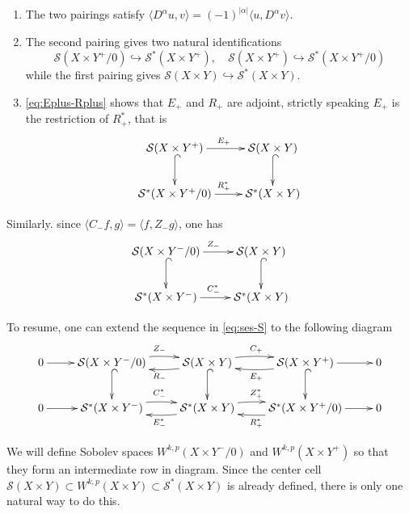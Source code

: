 \begin{remark}
\label{rem:coupling-S}
\begin{enumerate}
\item The two pairings satisfy \(\langle D^\alpha u, v \rangle = (-1)^{|\alpha|} \langle u,
   D^\alpha v \rangle\).
\item The second pairing gives two natural identifications
\[
    \mathcal{S}(X\times Y^+/0) \hookrightarrow \mathcal{S}^*(X\times Y^+),\quad
   \mathcal{S}(X\times Y^+) \hookrightarrow \mathcal{S}^*(X\times Y^+/0)
   \]
while the first pairing gives \(\mathcal{S}(X\times Y) \hookrightarrow
   \mathcal{S}^*(X\times Y)\).
\item \eqref{eq:Eplus-Rplus} shows that \(E_+\) and \(R_+\) are adjoint, strictly speaking
\(E_+\) is the restriction of \(R_+^*\), that is
\[
    \xymatrix{
    \mathcal{S}(X\times Y^+) \ar@{^{(}->}[d] \ar@{->}[r]^{E_+} & \mathcal{S}(X\times Y) \ar@{^{(}->}[d] \\
    \mathcal{S}^*(X\times Y^+/0) \ar@{->}[r]^{R_+^*} & \mathcal{S}^*(X\times Y)
    }
   \]
\end{enumerate}
\end{remark}

Similarly. since \(\langle C_- f, g \rangle = \langle f, Z_- g \rangle\), one has
\[
     \xymatrix{
    \mathcal{S}(X\times Y^-/0) \ar@{^{(}->}[d] \ar@{->}[r]^{Z_-} & \mathcal{S}(X\times Y) \ar@{^{(}->}[d] \\
    \mathcal{S}^*(X\times Y^-) \ar@{->}[r]^{C_-^*} & \mathcal{S}^*(X\times Y)
    }
\]

To resume, one can extend the sequence in \eqref{eq:ses-S} to the following diagram
\begin{equation}
\label{eq:ses-S-Sstar}
\xymatrix{
0 \ar@{->}[r] & \mathcal{S}(X\times Y^-/0) \ar@{^{(}->}[d] \ar@/^/@{->}[r]^{Z_-} & \mathcal{S}(X\times Y) \ar@{^{(}->}[d] \ar@/^/@{->}[r]^{C_+} \ar@/^/@{->}[l]^{R_-} & \mathcal{S}(X\times Y^+) \ar@{^{(}->}[d] \ar@{->}[r] \ar@/^/@{->}[l]^{E_+} & 0 \\
0 \ar@{->}[r] & \mathcal{S}^*(X\times Y^-) \ar@/^/@{->}[r]^{C_-^*} & \mathcal{S}^*(X\times Y) \ar@/^/@{->}[r]^{Z_+^*} \ar@/^/@{->}[l]^{E_-^*} & \mathcal{S}^*(X\times Y^+/0) \ar@{->}[r] \ar@/^/@{->}[l]^{R_+^*} & 0
}
\end{equation}

We will define Sobolev spaces \(W^{k,p}(X\times Y^-/0)\) and \(W^{k,p}(X\times Y^+)\)
so that they form an intermediate row in diagram. Since the center cell \(\mathcal{S}(X\times Y)\subset W^{k,p}(X\times Y) \subset \mathcal{S}^*(X\times Y)\) is
already defined, there is only one natural way to do this.

